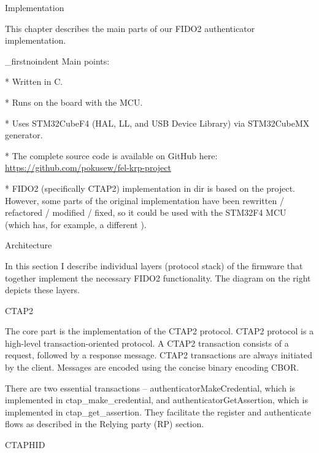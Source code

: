\chap[implementation] Implementation

This chapter describes the main parts of our FIDO2 authenticator implementation.

\_firstnoindent
{\sbf Main points:}

\begitems

* Written in {\sbf C}.

* Runs on the  board with the  MCU.

* Uses STM32CubeF4 (HAL, LL, and USB Device Library) via STM32CubeMX generator.

* The complete source code is available on GitHub here:\nl
\url{https://github.com/pokusew/fel-krp-project}

* FIDO2 (specifically CTAP2) implementation in  dir is based on the  project. However, some parts of the original implementation have been rewritten / refactored / modified / fixed, so it could be used with the STM32F4 MCU (which has, for example, a different ).

\enditems

\sec Architecture

In this section I describe individual layers (protocol stack) of the firmware that together implement the necessary FIDO2 functionality. The diagram on the right depicts these layers.


\secc CTAP2

The core part is the implementation of the CTAP2 protocol. CTAP2 protocol is a high-level transaction-oriented protocol. A CTAP2 transaction consists of a request, followed by a response message. CTAP2 transactions are always initiated by the client. Messages are encoded using the concise binary encoding CBOR.

There are two essential transactions – authenticatorMakeCredential, which is implemented in ctap_make_credential, and authenticatorGetAssertion, which is implemented in ctap_get_assertion. They facilitate the register and authenticate flows as described in the Relying party (RP) section.


\secc CTAPHID

